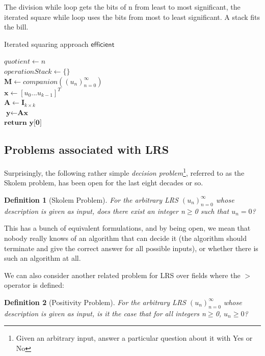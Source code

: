 \documentclass{article}
\newtheorem{definition}{Definition}[section]
\begin{document}
The division while loop gets the bits of n from least to most significant, the iterated square while loop uses the bits from most to least significant. A stack fits the bill.
\newpage
\begin{algorithm}[ht]
\caption {Iterated squaring approach $\mathsf{efficient}$}
\SetAlgoLined
\DontPrintSemicolon
{}
$quotient \gets n$\\
$operationStack \gets \{\}$\\
$\textbf{M} \gets companion ((u_n)_{n=0}^{\infty})$\\
$\textbf{x} \gets [u_0...u_{k-1}]^T$\\
$\textbf{A} \gets \textbf{I}_{k \times k}$\\
$\textbf{y} \gets \textbf{Ax}$\\
$\textbf{return y[0]}$\\
\end{algorithm}
\subsection{Problems associated with LRS}
Surprisingly, the following rather simple \textit{decision problem}\footnote[5]{Given an arbitrary input, answer a particular question about it with Yes or No}, referred to as the Skolem problem, has been open for the last eight decades or so.

\begin{definition}[Skolem Problem]
For the arbitrary LRS $(u_n)_{n=0}^{\infty}$ whose description is given as input, does there exist an integer n$\ge$0 such that $u_n=0$?
\end{definition}

This has a bunch of equivalent formulations, and by being open, we mean that nobody really knows of an algorithm that can decide it (the algorithm should terminate and give the correct answer for all possible inputs), or whether there is such an algorithm at all.

We can also consider another related problem for LRS over fields where the $>$ operator is defined:

\begin{definition}[Positivity Problem]
For the arbitrary LRS $(u_n)_{n=0}^{\infty}$ whose description is given as input, is it the case that for all integers n$\ge$0, $u_n\ge0$?
\end{definition}
\end{document}
